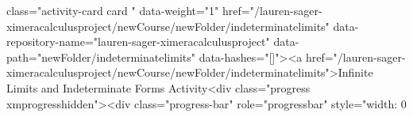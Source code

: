 class="activity-card  card " data-weight="1" href="/lauren-sager-ximeracalculusproject/newCourse/newFolder/indeterminatelimits" data-repository-name="lauren-sager-ximeracalculusproject" data-path="newFolder/indeterminatelimits" data-hashes="[]"><a href="/lauren-sager-ximeracalculusproject/newCourse/newFolder/indeterminatelimits">Infinite Limits and Indeterminate Forms Activity<div class="progress xmprogresshidden"><div class="progress-bar" role="progressbar" style="width: 0%
